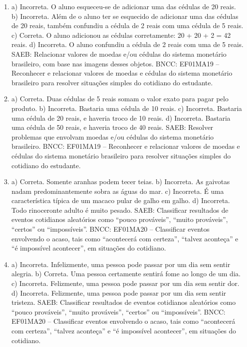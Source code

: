 \begin{enumerate}
\item
a) Incorreta. O aluno esqueceu-se de adicionar uma das cédulas de 20
reais.
b) Incorreta. Além de o aluno ter se esquecido de adicionar uma das
cédulas de 20 reais, também confundiu a cédula de 2 reais com
uma cédula de 5 reais.
c) Correta. O aluno adicionou as cédulas corretamente: 20 + 20 + 2 = 42
reais.
d) Incorreta. O aluno confundiu a cédula de 2 reais com uma de 5
reais.
SAEB: Relacionar valores de moedas e/ou cédulas do sistema
monetário brasileiro, com base nas imagens desses objetos.
BNCC: EF01MA19 -- Reconhecer e relacionar valores de moedas e cédulas do
sistema monetário brasileiro para resolver situações simples do
cotidiano do estudante.

\item
a) Correta. Duas cédulas de 5 reais somam o valor exato para pagar pelo produto.
b) Incorreta. Bastaria uma cédula de 10 reais.
c) Incorreta. Bastaria uma cédula de 20 reais, e haveria troco de 10 reais.
d) Incorreta. Bastaria uma cédula de 50 reais, e haveria troco de 40 reais.
SAEB: Resolver problemas que envolvam moedas e/ou cédulas do
sistema monetário brasileiro.
BNCC: EF01MA19 -- Reconhecer e relacionar valores de moedas e cédulas do
sistema monetário brasileiro para resolver situações simples do
cotidiano do estudante.

\item
a) Correta. Somente aranhas podem tecer teias.
b) Incorreta. As gaivotas nadam predominantemente sobra as águas do mar.
c) Incorreta. É uma característica típica de um macaco pular de galho em
galho.
d) Incorreta. Todo rinoceronte adulto é muito pesado.
SAEB: Classificar resultados de eventos cotidianos aleatórios como
``pouco prováveis'', ``muito prováveis'', ``certos'' ou ``impossíveis''.
BNCC: EF01MA20 -- Classificar eventos envolvendo o acaso, tais como
``acontecerá com certeza'', ``talvez aconteça'' e ``é impossível
acontecer'', em situações do cotidiano.

\item
a) Incorreta. Infelizmente, uma pessoa pode passar por um dia sem sentir alegria.
b) Correta. Uma pessoa certamente sentirá fome ao longo de um dia.
c) Incorreta. Felizmente, uma pessoa pode passar por um dia sem sentir dor.
d) Incorreta. Felizmente, uma pessoa pode passar por um dia sem sentir tristeza.
SAEB: Classificar resultados de eventos cotidianos aleatórios como
``pouco prováveis'', ``muito prováveis'', ``certos'' ou ``impossíveis''.
BNCC: EF01MA20 -- Classificar eventos envolvendo o acaso, tais como
``acontecerá com certeza'', ``talvez aconteça'' e ``é impossível
acontecer'', em situações do cotidiano.


\end{enumerate}
